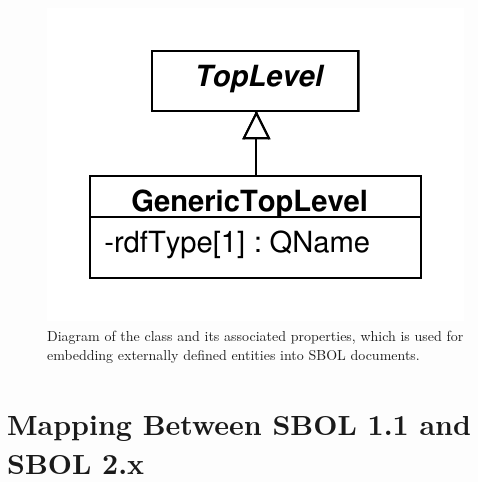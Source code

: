 \begin{figure}[ht]
\begin{center}
\includegraphics[scale=0.6]{uml/generictoplevel}
\caption[]{Diagram of the  class and its associated properties, which is used for embedding externally defined entities into SBOL documents.}
\label{uml:generictoplevel}
\end{center}
\end{figure}

\section{Mapping Between SBOL 1.1 and SBOL 2.x}
\label{sec:mapping}

